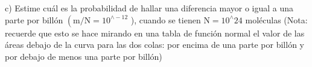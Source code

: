 c) Estime cuál es la probabilidad de hallar una diferencia mayor o igual a una parte por billón $\left(\mathrm{m} / \mathrm{N}=10^{\wedge-12}\right.$ ), cuando se tienen $\mathrm{N}=10^{\wedge} 24$ moléculas (Nota: recuerde que esto se hace mirando en una tabla de función normal el valor de las áreas debajo de la curva para las dos colas: por encima de una parte por billón y por debajo de menos una parte por billón)